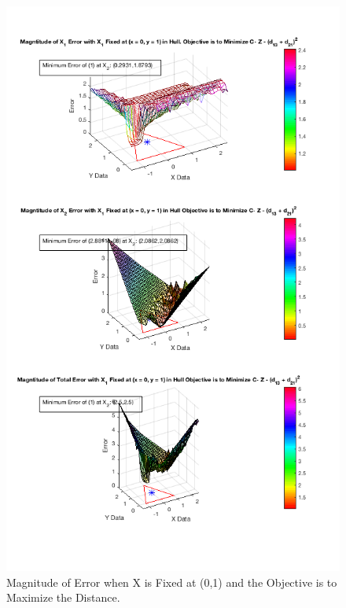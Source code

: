 \documentclass[answers]{exam}
\begin{document}
  \begin{figure}[H]
    \centering
    
        \caption{Magnitude of Error when X is Fixed at (0,1) and the Objective is to Maximize the Distance.}
    \includegraphics[scale=.7]{Problem8f7.png}
    \end{figure} 
    
\end{document}
